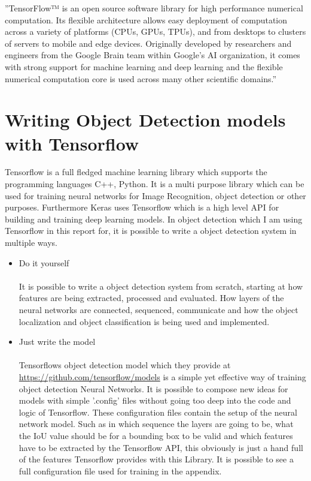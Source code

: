 
''TensorFlow™ is an open source software library for high performance numerical computation. Its flexible architecture allows easy deployment
of computation across a variety of platforms (CPUs, GPUs, TPUs), and from desktops to clusters of servers to mobile and edge devices.
Originally developed by researchers and engineers from the Google Brain team within Google’s AI organization, it comes with strong support
for machine learning and deep learning and the flexible numerical computation core is used across many other scientific
domains.''\cite{tensorflow}

\section{Writing Object Detection models with Tensorflow}\label{train-with-tensorflow}
Tensorflow is a full fledged machine learning library which supports the programming languages C++, Python. It is a multi purpose library
which can be used for training neural networks for Image Recognition, object detection or other purposes. Furthermore Keras uses Tensorflow
which is a high level API for building and training deep learning models. In object detection which I am using Tensorflow in this
report for, it is possible to write a object detection system in multiple ways.
\begin{itemize}
    \item Do it yourself \\ \\
        It is possible to write a object detection system from scratch, starting at how features are being extracted, processed and
        evaluated. How layers of the neural networks are connected, sequenced, communicate and how the object localization and object
        classification is being used and implemented.
    \item Just write the model \\ \\
        Tensorflows object detection model which they provide at \url{https://github.com/tensorflow/models} is a simple yet effective way of
        training object detection Neural Networks. It is possible to compose new ideas for models with simple '.config' files without going
        too deep into the code and logic of Tensorflow. These configuration files contain the setup of the neural network model. Such as in
        which sequence the layers are going to be, what the IoU value should be for a bounding box to be valid and which features have to
        be extracted by the Tensorflow API, this obviously is just a hand full of the features Tensorflow provides with this Library.
        It is possible to see a full configuration file used for training in the appendix.
\end{itemize}

